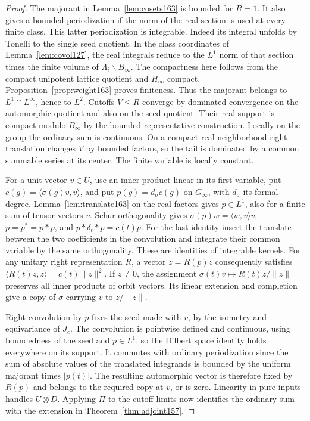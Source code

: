 \documentclass[a4paper,11pt]{article}
\theoremstyle{definition}
\theoremstyle{remark}
\numberwithin{equation}{section}
\begin{document}
\begin{proof}
The majorant in Lemma~\ref{lem:cosets163} is bounded for \(R=1\).
It also gives a bounded periodization if the norm of the real
section is used at every finite class. This latter periodization
is integrable. Indeed its integral unfolds by Tonelli to the
single seed quotient. In the class coordinates of
Lemma~\ref{lem:covol127}, the real integrals reduce to the
\(L^1\) norm of that section times the finite volume of
\(\Lambda_i\backslash B_\infty\). The compactness here follows
from the compact unipotent lattice quotient and \(H_\infty\)
compact. Proposition~\ref{prop:weight163} proves finiteness.
Thus the majorant belongs to \(L^1\cap L^\infty\), hence to
\(L^2\). Cutoffs \(V\le R\) converge by dominated convergence
on the automorphic quotient and also on the seed quotient.
Their real support is compact modulo \(B_\infty\) by the
bounded representative construction. Locally on the group the
ordinary sum is continuous. On a compact real neighborhood
right translation changes \(V\) by bounded factors, so the
tail is dominated by a common summable series at its center.
The finite variable is locally constant.

For a unit vector \(v\in U\), use an inner product linear in its
first variable, put \(c(g)=\langle\sigma(g)v,v\rangle\), and
put \(p(g)=d_\sigma\overline{c(g)}\) on \(G_\infty\), with
\(d_\sigma\) its formal degree. Lemma~\ref{lem:translate163}
on the real factors gives \(p\in L^1\), also for a finite sum
of tensor vectors \(v\). Schur orthogonality gives
\(\sigma(p)w=\langle w,v\rangle v\),
\(p=p^*=p*p\), and
\(p*\delta_t*p=c(t)p\). For the last identity insert the
translate between the two coefficients in the convolution and
integrate their common variable by the same orthogonality.
These are identities of integrable kernels. For any unitary
right representation \(R\), a vector \(z=R(p)z\) consequently
satisfies \(\langle R(t)z,z\rangle=c(t)\|z\|^2\).
If \(z\ne0\), the assignment \(\sigma(t)v\mapsto
R(t)z/\|z\|\) preserves all inner products of orbit vectors.
Its linear extension and completion give a copy of \(\sigma\)
carrying \(v\) to \(z/\|z\|\).

Right convolution by \(p\) fixes the seed made with \(v\),
by the isometry and equivariance of \(J_c\). The convolution
is pointwise defined and continuous, using boundedness of the
seed and \(p\in L^1\), so the Hilbert space identity holds
everywhere on its support. It commutes with ordinary
periodization since the sum of absolute values of the translated
integrands is bounded by the uniform majorant times
\(|p(t)|\). The resulting automorphic vector is therefore
fixed by \(R(p)\) and belongs to the required copy at \(v\),
or is zero. Linearity in pure inputs handles \(U\otimes D\).
Applying \(\Pi\) to the cutoff limits now identifies the
ordinary sum with the extension in Theorem~\ref{thm:adjoint157}.


\end{proof}
\end{document}
